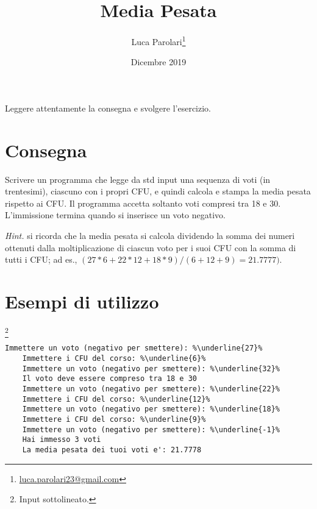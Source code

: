 \documentclass[addpoints,12pt,answers]{exam}
\author{Luca Parolari\footnote{\href{mailto:luca.parolari23@gmail.com}{luca.parolari23@gmail.com}}}
\begin{document}
    
    \title{Media Pesata}
    \date{Dicembre 2019}
    
    \maketitle
    
    Leggere attentamente la consegna e svolgere l'esercizio.
    
    \section{Consegna}
    Scrivere un programma che legge da std input una sequenza di voti (in trentesimi), ciascuno con i propri CFU, e quindi calcola e stampa la media pesata rispetto ai CFU. Il programma accetta soltanto voti compresi tra 18 e 30. L'immissione termina quando si inserisce un voto negativo.
    
    \textit{Hint.} si ricorda che la media pesata si calcola dividendo la somma dei numeri ottenuti dalla moltiplicazione di ciascun voto per i suoi CFU con la somma di tutti i CFU; ad es., $(27*6 + 22*12 + 18*9) / (6+12+9) = 21.7777)$.
    
    \section{Esempi di utilizzo}
     \footnote{Input sottolineato.}
	
	\begin{lstlisting}[style=verbatim]
	Immettere un voto (negativo per smettere): %\underline{27}%
	Immettere i CFU del corso: %\underline{6}%
	Immettere un voto (negativo per smettere): %\underline{32}%
	Il voto deve essere compreso tra 18 e 30
	Immettere un voto (negativo per smettere): %\underline{22}%
	Immettere i CFU del corso: %\underline{12}%
	Immettere un voto (negativo per smettere): %\underline{18}%
	Immettere i CFU del corso: %\underline{9}%
	Immettere un voto (negativo per smettere): %\underline{-1}%
	Hai immesso 3 voti
	La media pesata dei tuoi voti e': 21.7778
	\end{lstlisting}
    
\end{document}
